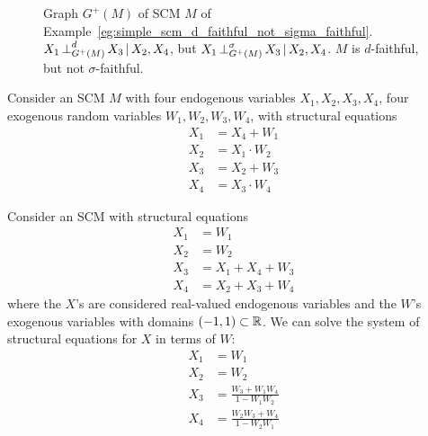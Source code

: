   \begin{Eg}\label{eg:simple_scm_d_faithful_not_sigma_faithful}
  \begin{figure}\centering
  \caption{Graph $G^+(M)$ of SCM $M$ of Example~\ref{eg:simple_scm_d_faithful_not_sigma_faithful}. 
  $X_1 \operatorname*{\perp}^d_{G^+(M)} X_3 \operatorname*{|} X_2, X_4$, but $X_1 \operatorname*{\perp}^{\sigma}_{G^+(M)} X_3 \operatorname*{|} X_2, X_4$.
  $M$ is $d$-faithful, but not $\sigma$-faithful.}
  \end{figure}
Consider an SCM $M$ with four endogenous variables $X_1,X_2,X_3,X_4$, four exogenous random variables $W_1,W_2,W_3,W_4$, with structural equations
  \begin{align*}
    X_1&=X_4+W_1 \\
    X_2&=X_1 \cdot W_2 \\
    X_3&=X_2+W_3 \\
    X_4&=X_3\cdot W_4
  \end{align*}

Consider an SCM with structural equations
  \begin{align*}
    X_1 &= W_1 \\
    X_2 &= W_2 \\
    X_3 &= X_1 + X_4 + W_3 \\
    X_4 &= X_2 + X_3 + W_4 
  \end{align*}
where the $X$'s are considered real-valued endogenous variables and the $W$'s exogenous variables with domains $(-1,1) \subset \mathbb{R}$.
We can solve the system of structural equations for $X$ in terms of $W$:
  \begin{align*}
    X_1 &= W_1 \\
    X_2 &= W_2 \\
    X_3 &= \frac{W_3 + W_1 W_4}{1 - W_1 W_2} \\
    X_4 &= \frac{W_2 W_3 + W_4}{1 - W_2 W_1}
  \end{align*}
\end{Eg}

